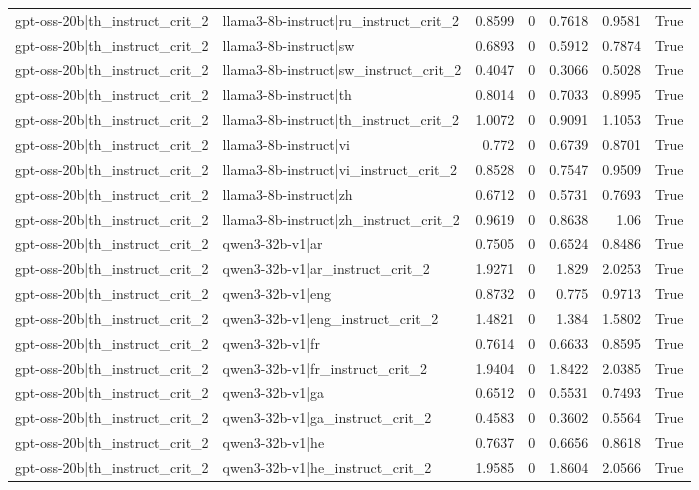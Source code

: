 \begin{table}
\begin{tabular}{l l r r r r l}
gpt-oss-20b|th_instruct_crit_2 & llama3-8b-instruct|ru_instruct_crit_2 & 0.8599 & 0 & 0.7618 & 0.9581 & True \\
gpt-oss-20b|th_instruct_crit_2 & llama3-8b-instruct|sw & 0.6893 & 0 & 0.5912 & 0.7874 & True \\
gpt-oss-20b|th_instruct_crit_2 & llama3-8b-instruct|sw_instruct_crit_2 & 0.4047 & 0 & 0.3066 & 0.5028 & True \\
gpt-oss-20b|th_instruct_crit_2 & llama3-8b-instruct|th & 0.8014 & 0 & 0.7033 & 0.8995 & True \\
gpt-oss-20b|th_instruct_crit_2 & llama3-8b-instruct|th_instruct_crit_2 & 1.0072 & 0 & 0.9091 & 1.1053 & True \\
gpt-oss-20b|th_instruct_crit_2 & llama3-8b-instruct|vi & 0.772 & 0 & 0.6739 & 0.8701 & True \\
gpt-oss-20b|th_instruct_crit_2 & llama3-8b-instruct|vi_instruct_crit_2 & 0.8528 & 0 & 0.7547 & 0.9509 & True \\
gpt-oss-20b|th_instruct_crit_2 & llama3-8b-instruct|zh & 0.6712 & 0 & 0.5731 & 0.7693 & True \\
gpt-oss-20b|th_instruct_crit_2 & llama3-8b-instruct|zh_instruct_crit_2 & 0.9619 & 0 & 0.8638 & 1.06 & True \\
gpt-oss-20b|th_instruct_crit_2 & qwen3-32b-v1|ar & 0.7505 & 0 & 0.6524 & 0.8486 & True \\
gpt-oss-20b|th_instruct_crit_2 & qwen3-32b-v1|ar_instruct_crit_2 & 1.9271 & 0 & 1.829 & 2.0253 & True \\
gpt-oss-20b|th_instruct_crit_2 & qwen3-32b-v1|eng & 0.8732 & 0 & 0.775 & 0.9713 & True \\
gpt-oss-20b|th_instruct_crit_2 & qwen3-32b-v1|eng_instruct_crit_2 & 1.4821 & 0 & 1.384 & 1.5802 & True \\
gpt-oss-20b|th_instruct_crit_2 & qwen3-32b-v1|fr & 0.7614 & 0 & 0.6633 & 0.8595 & True \\
gpt-oss-20b|th_instruct_crit_2 & qwen3-32b-v1|fr_instruct_crit_2 & 1.9404 & 0 & 1.8422 & 2.0385 & True \\
gpt-oss-20b|th_instruct_crit_2 & qwen3-32b-v1|ga & 0.6512 & 0 & 0.5531 & 0.7493 & True \\
gpt-oss-20b|th_instruct_crit_2 & qwen3-32b-v1|ga_instruct_crit_2 & 0.4583 & 0 & 0.3602 & 0.5564 & True \\
gpt-oss-20b|th_instruct_crit_2 & qwen3-32b-v1|he & 0.7637 & 0 & 0.6656 & 0.8618 & True \\
gpt-oss-20b|th_instruct_crit_2 & qwen3-32b-v1|he_instruct_crit_2 & 1.9585 & 0 & 1.8604 & 2.0566 & True \\

\end{tabular}
\end{table}
